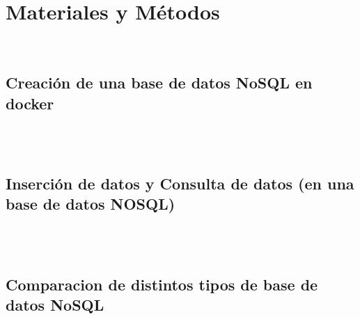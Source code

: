 \documentclass[twoside,onecolumn]{article}
\begin{document}
\section{Materiales y Métodos}
\begin{flushright}
\begin{itemize}
\textbf{}\\
\subsection{Creación de una base de datos NoSQL en docker}
\textbf{}\\


\textbf{}\\
\subsection{Inserción de datos y Consulta de datos (en una base de datos NOSQL)}
\textbf{}\\



\textbf{}\\
\subsection{Comparacion de distintos tipos de base de datos NoSQL}
\textbf{}\\



\end{itemize}
\end{flushright}
\end{document}
